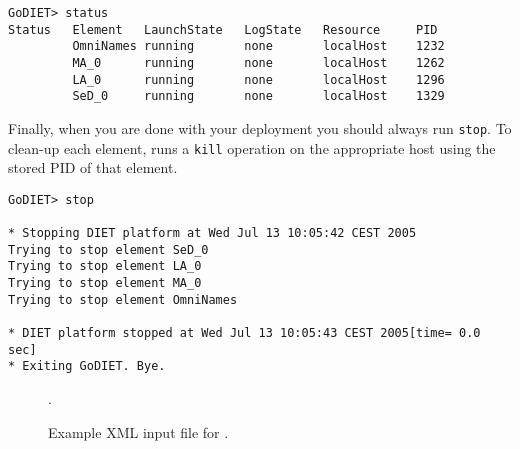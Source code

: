 \begin{verbatim}
GoDIET> status
Status   Element   LaunchState   LogState   Resource     PID
         OmniNames running       none       localHost    1232
         MA_0      running       none       localHost    1262
         LA_0      running       none       localHost    1296
         SeD_0     running       none       localHost    1329
\end{verbatim}

Finally, when you are done with your \diet deployment you should always run 
\texttt{stop}.  To clean-up each element, \godiet runs a \texttt{kill}
operation on the appropriate host using the stored PID of that element.

\begin{verbatim}
GoDIET> stop

* Stopping DIET platform at Wed Jul 13 10:05:42 CEST 2005
Trying to stop element SeD_0
Trying to stop element LA_0
Trying to stop element MA_0
Trying to stop element OmniNames

* DIET platform stopped at Wed Jul 13 10:05:43 CEST 2005[time= 0.0 sec]
* Exiting GoDIET. Bye.
\end{verbatim}

\begin{figure}[p]
.
\caption{Example XML input file for \godiet.\label{fig:godietXml}}
\end{figure}







